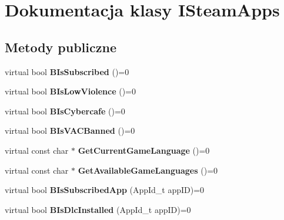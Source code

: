 \hypertarget{class_i_steam_apps}{}\section{Dokumentacja klasy I\+Steam\+Apps}
\label{class_i_steam_apps}
\subsection*{Metody publiczne}
\begin{DoxyCompactItemize}
\item 
\mbox{\label{class_i_steam_apps_a46b1314886cad0fc36b86a2e417c1932}} 
virtual bool {\bfseries B\+Is\+Subscribed} ()=0
\item 
\mbox{\label{class_i_steam_apps_abf824c3b654c953f11518de5afc2e6ab}} 
virtual bool {\bfseries B\+Is\+Low\+Violence} ()=0
\item 
\mbox{\label{class_i_steam_apps_a3c090ea4660143a30c76ee3571122afa}} 
virtual bool {\bfseries B\+Is\+Cybercafe} ()=0
\item 
\mbox{\label{class_i_steam_apps_a0a3eeb3fbc774390d8652605527dadac}} 
virtual bool {\bfseries B\+Is\+V\+A\+C\+Banned} ()=0
\item 
\mbox{\label{class_i_steam_apps_ada18d64c49d8139f85f00ee5cfc03d1b}} 
virtual const char $\ast$ {\bfseries Get\+Current\+Game\+Language} ()=0
\item 
\mbox{\label{class_i_steam_apps_a3ecdf69a129d1f58d8d1e11b38e534eb}} 
virtual const char $\ast$ {\bfseries Get\+Available\+Game\+Languages} ()=0
\item 
\mbox{\label{class_i_steam_apps_a08d3b10f8c23035283448541211e9774}} 
virtual bool {\bfseries B\+Is\+Subscribed\+App} (App\+Id\+\_\+t app\+ID)=0
\item 
\mbox{\label{class_i_steam_apps_a183d85a7b9c38ec921e980d2ecce2dac}} 
virtual bool {\bfseries B\+Is\+Dlc\+Installed} (App\+Id\+\_\+t app\+ID)=0
\item 
\mbox{\label{class_i_steam_apps_ac1c6be2c2d7337812994ddb4d8c04bf0}} 

\end{DoxyCompactItemize}
